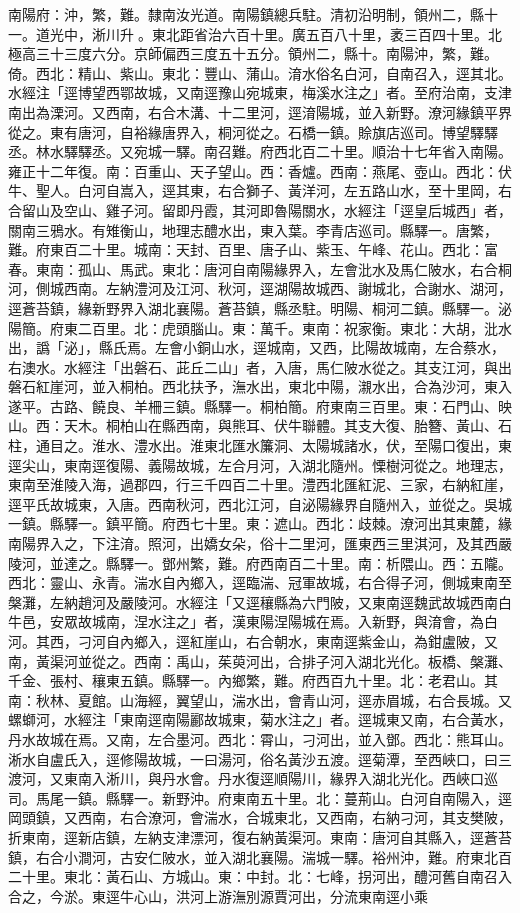 \begin{pinyinscope}
南陽府：沖，繁，難。隸南汝光道。南陽鎮總兵駐。清初沿明制，領州二，縣十一。道光中，淅川升。東北距省治六百十里。廣五百八十里，袤三百四十里。北極高三十三度六分。京師偏西三度五十五分。領州二，縣十。南陽沖，繁，難。倚。西北：精山、紫山。東北：豐山、蒲山。淯水俗名白河，自南召入，逕其北。水經注「逕博望西鄂故城，又南逕豫山宛城東，梅溪水注之」者。至府治南，支津南出為溧河。又西南，右合木溝、十二里河，逕淯陽城，並入新野。潦河緣鎮平界從之。東有唐河，自裕緣唐界入，桐河從之。石橋一鎮。賒旗店巡司。博望驛驛丞。林水驛驛丞。又宛城一驛。南召難。府西北百二十里。順治十七年省入南陽。雍正十二年復。南：百重山、天子望山。西：香爐。西南：燕尾、壺山。西北：伏牛、聖人。白河自嵩入，逕其東，右合獅子、黃洋河，左五路山水，至十里岡，右合留山及空山、雞子河。留即丹霞，其河即魯陽關水，水經注「逕皇后城西」者，關南三鴉水。有雉衡山，地理志醴水出，東入葉。李青店巡司。縣驛一。唐繁，難。府東百二十里。城南：天封、百里、唐子山、紫玉、午峰、花山。西北：富春。東南：孤山、馬武。東北：唐河自南陽緣界入，左會沘水及馬仁陂水，右合桐河，側城西南。左納澧河及江河、秋河，逕湖陽故城西、謝城北，合謝水、湖河，逕蒼苔鎮，緣新野界入湖北襄陽。蒼苔鎮，縣丞駐。明陽、桐河二鎮。縣驛一。泌陽簡。府東二百里。北：虎頭腦山。東：萬千。東南：祝家衡。東北：大胡，沘水出，譌「泌」，縣氏焉。左會小銅山水，逕城南，又西，比陽故城南，左合蔡水，右澳水。水經注「出磐石、茈丘二山」者，入唐，馬仁陂水從之。其支江河，與出磐石紅崖河，並入桐柏。西北扶予，潕水出，東北中陽，瀙水出，合為沙河，東入遂平。古路、饒良、羊柵三鎮。縣驛一。桐柏簡。府東南三百里。東：石門山、映山。西：天木。桐柏山在縣西南，與熊耳、伏牛聯體。其支大復、胎簪、黃山、石柱，通目之。淮水、澧水出。淮東北匯水簾洞、太陽城諸水，伏，至陽口復出，東逕尖山，東南逕復陽、義陽故城，左合月河，入湖北隨州。慄樹河從之。地理志，東南至淮陵入海，過郡四，行三千四百二十里。澧西北匯紅泥、三家，右納紅崖，逕平氏故城東，入唐。西南秋河，西北江河，自泌陽緣界自隨州入，並從之。吳城一鎮。縣驛一。鎮平簡。府西七十里。東：遮山。西北：歧棘。潦河出其東麓，緣南陽界入之，下注淯。照河，出嬌女朵，俗十二里河，匯東西三里淇河，及其西嚴陵河，並達之。縣驛一。鄧州繁，難。府西南百二十里。南：析隈山。西：五隴。西北：靈山、永青。湍水自內鄉入，逕臨湍、冠軍故城，右合得子河，側城東南至槃灘，左納趙河及嚴陵河。水經注「又逕穰縣為六門陂，又東南逕魏武故城西南白牛邑，安眾故城南，涅水注之」者，漢東陽涅陽城在焉。入新野，與淯會，為白河。其西，刁河自內鄉入，逕紅崖山，右合朝水，東南逕紫金山，為鉗盧陂，又南，黃渠河並從之。西南：禹山，茱萸河出，合排子河入湖北光化。板橋、槃灘、千金、張村、穰東五鎮。縣驛一。內鄉繁，難。府西百九十里。北：老君山。其南：秋林、夏館。山海經，翼望山，湍水出，會青山河，逕赤眉城，右合長城。又螺螄河，水經注「東南逕南陽酈故城東，菊水注之」者。逕城東又南，右合黃水，丹水故城在焉。又南，左合墨河。西北：霄山，刁河出，並入鄧。西北：熊耳山。淅水自盧氏入，逕修陽故城，一曰湯河，俗名黃沙五渡。逕菊潭，至西峽口，曰三渡河，又東南入淅川，與丹水會。丹水復逕順陽川，緣界入湖北光化。西峽口巡司。馬尾一鎮。縣驛一。新野沖。府東南五十里。北：蔓荊山。白河自南陽入，逕岡頭鎮，又西南，右合潦河，會湍水，合城東北，又西南，右納刁河，其支樊陂，折東南，逕新店鎮，左納支津漂河，復右納黃渠河。東南：唐河自其縣入，逕蒼苔鎮，右合小澗河，古安仁陂水，並入湖北襄陽。湍城一驛。裕州沖，難。府東北百二十里。東北：黃石山、方城山。東：中封。北：七峰，拐河出，醴河舊自南召入合之，今淤。東逕牛心山，洪河上游潕別源賈河出，分流東南逕小乘
\end{pinyinscope}
